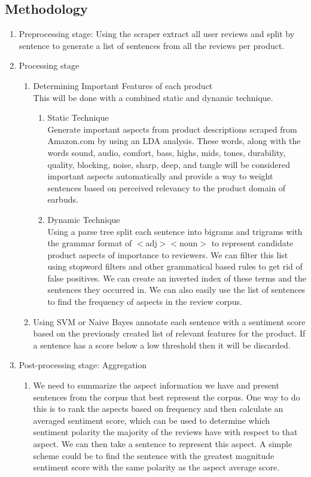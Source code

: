 \documentclass{article}
\begin{document}
\subsection{Methodology}
\begin{enumerate}
\item Preprocessing stage: 
\newline Using the scraper extract all user reviews and split by sentence to generate a list of sentences from all the reviews per product.

\item Processing stage
	\begin{enumerate} [label* = \arabic*.]
	\item Determining Important Features of each product \\
	This will be done with a combined static and dynamic technique.
		\begin{enumerate} [label* = \arabic*.]
	\item Static Technique \\
	 Generate important aspects from product descriptions scraped from Amazon.com by using an LDA analysis. These words, along with the words sound, audio, comfort, bass, highs, mids, tones, durability, quality, blocking, noise, sharp, deep, and tangle will be considered important aspects automatically and provide a way to weight sentences based on perceived relevancy to the product domain of earbuds.
	\item Dynamic Technique \\
	 Using a parse tree split each sentence into bigrams and trigrams with the grammar format of $<$adj$><$noun$>$ to represent candidate product aspects of importance to reviewers. We can filter this list using stopword filters and other grammatical based rules to get rid of false positives. We can create an inverted index of these terms and the sentences they occurred in. We can also easily use the list of sentences to find the frequency of aspects in the review corpus.
	\end{enumerate}
		\item Using SVM or Naive Bayes annotate each sentence with a sentiment score based on the previously created list of relevant features for the product. If a sentence has a score below a low threshold then it will be discarded.
	\end{enumerate}
\item Post-processing stage: Aggregation
	\begin{enumerate}[label* = \arabic*.]
	\item We need to summarize the aspect information we have and present sentences from the corpus that best represent the corpus. One way to do this is to rank the aspects based on frequency and then calculate an averaged sentiment score, which can be used to determine which sentiment polarity the majority of the reviews have with respect to that aspect. We can then take a sentence to represent this aspect. A simple scheme could be to find the sentence with the greatest magnitude sentiment score with the same polarity as the aspect average score.
	\end{enumerate}
\end{enumerate}
\end{document}
